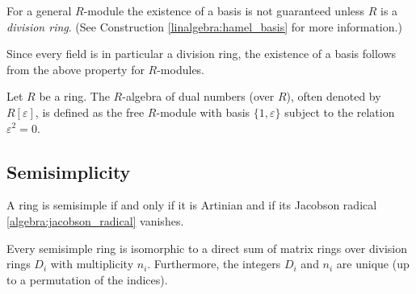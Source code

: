     \begin{property}\label{algebra:module_basis}
        For a general $R$-module the existence of a basis is not guaranteed unless $R$ is a \textit{division ring}. (See Construction \ref{linalgebra:hamel_basis} for more information.)
    \end{property}
    \begin{result}
        Since every field is in particular a division ring, the existence of a basis follows from the above property for $R$-modules.
    \end{result}


    \begin{example}
        Let $R$ be a ring. The $R$-algebra of dual numbers (over $R$), often denoted by $R[\varepsilon]$, is defined as the free $R$-module with basis $\{1,\varepsilon\}$ subject to the relation $\varepsilon^2 = 0$.
    \end{example}

\subsection{Semisimplicity}

    \begin{property}
        A ring is semisimple if and only if it is Artinian and if its Jacobson radical \ref{algebra:jacobson_radical} vanishes.
    \end{property}

    \begin{theorem}\label{algebra:artin_wedderburn}
        Every semisimple ring is isomorphic to a direct sum of matrix rings over division rings $D_i$ with multiplicity $n_i$. Furthermore, the integers $D_i$ and $n_i$ are unique (up to a permutation of the indices).
    \end{theorem}

